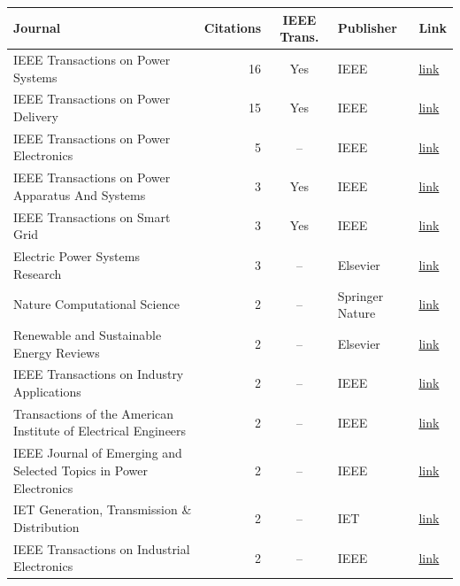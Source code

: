 \begin{table}[htbp]
\centering
\small
\begin{tabular}{lrcll}
\toprule
Journal & Citations & IEEE Trans. & Publisher & Link \\
\midrule
    IEEE Transactions on Power Systems & 16 & Yes & IEEE & \href{https://ieeexplore.ieee.org/xpl/RecentIssue.jsp?punumber=59}{link} \\
    IEEE Transactions on Power Delivery & 15 & Yes & IEEE & \href{https://ieeexplore.ieee.org/xpl/RecentIssue.jsp?punumber=61}{link} \\
    IEEE Transactions on Power Electronics & 5 & -- & IEEE & \href{https://ieeexplore.ieee.org/xpl/RecentIssue.jsp?punumber=63}{link} \\
    IEEE Transactions on Power Apparatus And Systems & 3 & Yes & IEEE & \href{https://ieeexplore.ieee.org/xpl/RecentIssue.jsp?punumber=6115846}{link} \\
    IEEE Transactions on Smart Grid & 3 & Yes & IEEE & \href{https://ieeexplore.ieee.org/xpl/RecentIssue.jsp?punumber=5165411}{link} \\
    Electric Power Systems Research & 3 & -- & Elsevier & \href{https://www.sciencedirect.com/journal/electric-power-systems-research}{link} \\
    Nature Computational Science & 2 & -- & Springer Nature & \href{https://www.nature.com/natcomputsci/}{link} \\
    Renewable and Sustainable Energy Reviews & 2 & -- & Elsevier & \href{https://www.sciencedirect.com/journal/renewable-and-sustainable-energy-reviews}{link} \\
    IEEE Transactions on Industry Applications & 2 & -- & IEEE & \href{https://ieeexplore.ieee.org/xpl/RecentIssue.jsp?punumber=28}{link} \\
    Transactions of the American Institute of Electrical Engineers & 2 & -- & IEEE & \href{https://ieeexplore.ieee.org/xpl/RecentIssue.jsp?punumber=4763772}{link} \\
    IEEE Journal of Emerging and Selected Topics in Power Electronics & 2 & -- & IEEE & \href{https://ieeexplore.ieee.org/xpl/RecentIssue.jsp?punumber=6245517}{link} \\
    IET Generation, Transmission \& Distribution & 2 & -- & IET & \href{https://ietresearch.onlinelibrary.wiley.com/journal/17518695}{link} \\
    IEEE Transactions on Industrial Electronics & 2 & -- & IEEE & \href{https://ieeexplore.ieee.org/xpl/RecentIssue.jsp?punumber=41}{link} \\

\end{tabular}
\end{table}
